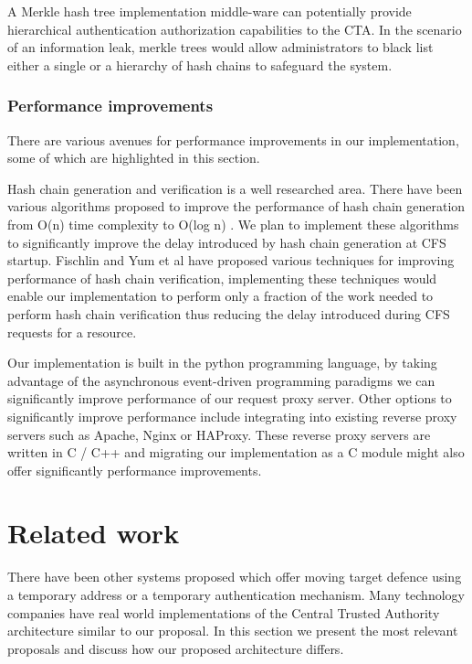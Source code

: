 \documentclass[a4paper,twoside]{article}
\begin{document}
A Merkle hash tree implementation middle-ware can potentially provide hierarchical authentication authorization \cite{yi_cloud_2012} capabilities to the CTA. In the scenario of an information leak, merkle trees would allow administrators to black list either a single or a hierarchy of hash chains to safeguard the system.

\subsubsection{Performance improvements}

There are various avenues for performance improvements in our implementation, some of which are highlighted in this section. 

Hash chain generation and verification is a well researched area. There have been various algorithms proposed to improve the performance of hash chain generation from O(n) time complexity to O(log n) \cite{coppersmith_almost_2002, jakobsson_fractal_2002, kim_improved_2003, sella_computation-storage_2003, yum_single-layer_2009}. We plan to implement these algorithms to significantly improve the delay introduced by hash chain generation at CFS startup. Fischlin and Yum et al \cite{fischlin_fast_2004, yum_fast_2010} have proposed various techniques for improving performance of hash chain verification, implementing these techniques would enable our implementation to perform only a fraction of the work needed to perform hash chain verification thus reducing the delay introduced during CFS requests for a resource. 

Our implementation is built in the python programming language, by taking advantage of the asynchronous event-driven programming paradigms we can significantly improve performance \cite{kinder_event-driven_2005} of our request proxy server. Other options to significantly improve performance include integrating into existing reverse proxy servers such as Apache, Nginx or HAProxy. These reverse proxy servers are written in C / C++ and migrating our implementation as a C module might also offer significantly performance improvements. 

\section{Related work}

There have been other systems proposed which offer moving target defence using a temporary address or a temporary authentication mechanism. Many technology companies have real world implementations of the Central Trusted Authority architecture similar to our proposal. In this section we present the most relevant proposals and discuss how our proposed architecture differs. 
\end{document}
